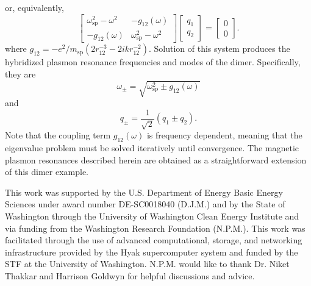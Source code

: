 \documentclass[journal=apchd5,manuscript=article]{achemso}
\begin{document}
or, equivalently,
\begin{equation}
\begin{bmatrix}
\omega_{\textrm{sp}}^2-\omega^2 & -g_{12}(\omega)\\
-g_{12}(\omega) & \omega_{\textrm{sp}}^2-\omega^2
\end{bmatrix}
\begin{bmatrix}
q_1\\
q_2
\end{bmatrix}
=
\begin{bmatrix}
0\\
0
\end{bmatrix}.
\label{eom_matrix}
\end{equation}
where $g_{12}=-e^2/m_{\textrm{sp}}(2r_{12}^{-3} - 2ikr_{12}^{-2}).$ Solution of this system produces the hybridized plasmon resonance frequencies and modes of the dimer. Specifically, they are
\begin{equation}
\omega_{\pm} = \sqrt{\omega_{\textrm{sp}}^2 \pm g_{12}(\omega)}
\label{eigenvalues}
\end{equation}
and
\begin{equation}
q_{\pm} = \frac{1}{\sqrt{2}}\left(q_1 \pm q_2\right).
\label{eigenvectors}
\end{equation}
Note that the coupling term $g_{12}(\omega)$ is frequency dependent, meaning that the eigenvalue problem must be solved iteratively until convergence. The magnetic plasmon resonances described herein are obtained as a straightforward extension of this dimer example.




\begin{acknowledgement}


This work was supported by the U.S. Department of Energy Basic Energy Sciences under award number DE-SC0018040 (D.J.M.) and by the State of Washington through the University of Washington Clean Energy Institute and via funding from the Washington Research Foundation (N.P.M.). This work was facilitated through the use of advanced computational, storage, and networking infrastructure provided by the Hyak supercomputer system and funded by the STF at the University of Washington. N.P.M. would like to thank Dr. Niket Thakkar and Harrison Goldwyn for helpful discussions and advice.
\end{acknowledgement}


\end{document}
